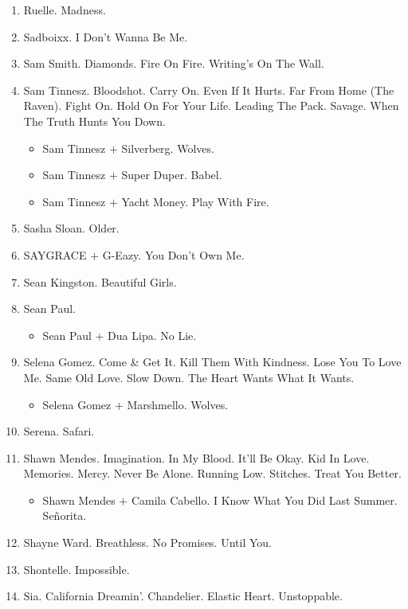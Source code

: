 \documentclass{article}
\begin{document}
\begin{enumerate}
	\begin{itemize}
		\item {\sc Ros\'e (BlackPink) $+$ G-Dragon.} Without You.
		\item {\sc Ros\'e (BlackPink) $+$ Jiso (BlackPink).} Love Yourself.
		\item {\sc Ros\'e (BlackPink) $+$ Lisa (BlackPink).} L.O.V.E.
		\item {\sc Ros\'e (BlackPink) $+$ Millenium.} Just Dance.
	\end{itemize}
	\item {\sc Ruelle.} Madness.
	\item {\sc Sadboixx.} I Don't Wanna Be Me.
	\item {\sc Sam Smith.} Diamonds. Fire On Fire. Writing's On The Wall.
	\item {\sc Sam Tinnesz.} Bloodshot. Carry On. Even If It Hurts. Far From Home (The Raven). Fight On. Hold On For Your Life. Leading The Pack. Savage. When The Truth Hunts You Down.
	\begin{itemize}
		\item {\sc Sam Tinnesz $+$ Silverberg.} Wolves.
		\item {\sc Sam Tinnesz $+$ Super Duper.} Babel.
		\item {\sc Sam Tinnesz $+$ Yacht Money.} Play With Fire.
	\end{itemize}
	\item {\sc Sasha Sloan.} Older.
	\item {\sc SAYGRACE $+$ G-Eazy.} You Don't Own Me.
	\item {\sc Sean Kingston.} Beautiful Girls.
	\item {\sc Sean Paul.}
	\begin{itemize}
		\item {\sc Sean Paul $+$ Dua Lipa.} No Lie.
	\end{itemize}
	\item {\sc Selena Gomez.} Come \& Get It. Kill Them With Kindness. Lose You To Love Me. Same Old Love. Slow Down. The Heart Wants What It Wants.
	\begin{itemize}
		\item {\sc Selena Gomez $+$ Marshmello.} Wolves.
	\end{itemize}
	\item {\sc Serena.} Safari.
	\item {\sc Shawn Mendes.} Imagination. In My Blood. It'll Be Okay. Kid In Love. Memories. Mercy. Never Be Alone. Running Low. Stitches. Treat You Better.
	\begin{itemize}
		\item {\sc Shawn Mendes $+$ Camila Cabello.} I Know What You Did Last Summer. Se\~norita.
	\end{itemize}
	\item {\sc Shayne Ward.} Breathless. No Promises. Until You.
	\item {\sc Shontelle.} Impossible.
	\item {\sc Sia.} California Dreamin'. Chandelier. Elastic Heart. Unstoppable.


\end{enumerate}
\end{document}
